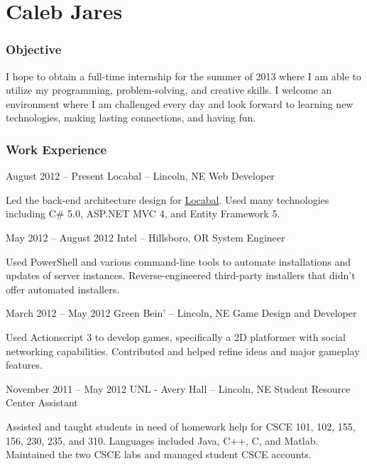 \documentclass{tccv}
\begin{document}
\part{Caleb Jares}

\section{Objective}

	I hope to obtain a full-time internship for the summer of 2013 where I am able to utilize my programming, problem-solving, and creative skills. I welcome an environment where I am challenged every day and look forward to learning new technologies, making lasting connections, and having fun.

\section{Work Experience}

	\begin{eventlist}

	\item{August 2012 -- Present}
	     {Locabal -- Lincoln, NE}
	     {Web Developer}

		Led the back-end architecture design for \href{http://locabal.com}{Locabal}. Used many technologies including C\# 5.0, ASP.NET MVC 4, and Entity Framework 5. 

	\item{May 2012 -- August 2012}
	     {Intel -- Hillsboro, OR}
	     {System Engineer}

	     Used PowerShell and various command-line tools to automate installations and updates of server instances. Reverse-engineered third-party installers that didn't offer automated installers. 

	\item{March 2012 -- May 2012}
	     {Green Bein' -- Lincoln, NE}
	     {Game Design and Developer}

	     Used Actionscript 3 to develop games, specifically a 2D platformer with social networking capabilities. Contributed and helped refine ideas and major gameplay features.

	\item{November 2011 -- May 2012}
	     {UNL - Avery Hall -- Lincoln, NE}
	     {Student Resource Center Assistant}

	     Assisted and taught students in need of homework help for CSCE 101, 102, 155, 156, 230, 235, and 310. Languages included Java, C++, C, and Matlab. Maintained the two CSCE labs and managed student CSCE accounts.

	\end{eventlist}
\end{document}

